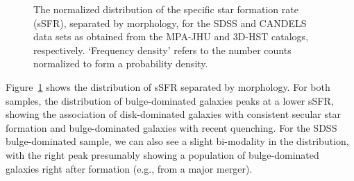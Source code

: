 \begin{figure}[htb]
	\begin{center}
  \end{center}
  \caption{The normalized distribution of the specific star formation rate\,(sSFR), separated by morphology, for the SDSS and CANDELS data sets as obtained from the MPA-JHU and 3D-HST catalogs, respectively. `Frequency density' refers to the number counts normalized to form a probability density.}
  \label{fig:ssfr_distr}
\end{figure}

Figure~\ref{fig:ssfr_distr} shows the distribution of sSFR separated by morphology. For both samples, the distribution of bulge-dominated galaxies peaks at a lower sSFR, showing the association of disk-dominated galaxies with consistent secular star formation and bulge-dominated galaxies with recent quenching. For the SDSS bulge-dominated sample, we can also see a slight bi-modality in the distribution, with the right peak presumably showing a population of bulge-dominated galaxies right after formation (e.g., from a major merger). 

